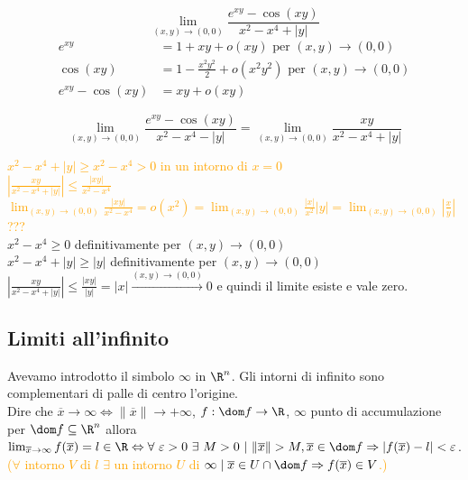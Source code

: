 \begin{exbar}
\begin{example}
	\begin{equation*}
		\lim_{(x,y)\rightarrow(0,0)}\frac{e^{xy}-\cos(xy)}{x^2-x^4+|y|}
	\end{equation*}
	\begin{align*} 
		e^{xy} &=1+xy+o(xy) \text{ per } (x,y)\rightarrow(0,0)
		\\
		\cos(xy) &=1-\frac{x^2y^2}{2}+o(x^2y^2) \text{ per } (x,y)\rightarrow(0,0)
		\\
		e^{xy}-\cos(xy) &=xy+o(xy)
	\end{align*}
	
	$$\lim_{(x,y)\rightarrow(0,0)}\frac{e^{xy}-\cos(xy)}{x^2-x^4-|y|}=\lim_{(x,y)\rightarrow(0,0)}\frac{xy}{x^2-x^4+|y|}$$
	
	\textcolor{orange}{$x^2-x^4+|y|\geq x^2-x^4>0$ in un intorno di $x=0$\\
		$|\frac{xy}{x^2-x^4+|y|}|\leq \frac{|xy|}{x^2-x^4}$\\
		$\lim_{(x,y)\rightarrow(0,0)}\frac{|xy|}{x^2-x^4}=o(x^2)=\lim_{(x,y)\rightarrow(0,0)} \frac{|x|}{x^2}|y|=\lim_{(x,y)\rightarrow(0,0)} |\frac{x}{y}|$???}\\
	$x^2-x^4 \geq 0$ definitivamente per $(x,y)\rightarrow(0,0)$\\
	$x^2-x^4+|y|\geq |y|$ definitivamente per $(x,y)\rightarrow(0,0)$\\
	$|\frac{xy}{x^2-x^4+|y|}|\leq \frac{|xy|}{|y|}=|x|\xrightarrow{(x,y)\rightarrow(0,0)} 0$ e quindi il limite esiste e vale zero.
\end{example}
\end{exbar}


\subsection{Limiti all'infinito}
Avevamo introdotto il simbolo  $\infty$ in $\R^n$. Gli intorni di infinito sono complementari di palle di centro l'origine.\\
Dire che $\overline{x} \rightarrow \infty \Leftrightarrow \|\overline{x}\|\rightarrow +\infty$, $f:\dom f\rightarrow\R$, $\infty$ punto di accumulazione per $\dom f \subseteq \R^n$ allora $\lim_{\overline{x}\rightarrow \infty} f(\overline{x})=l\in \R \Leftrightarrow \forall \,\, \epsilon >0 \,\, \exists\,\, M >0 \,\, |\,\, \|\overline{x}\|>M, \overline{x}\in \dom f \Rightarrow |f(\overline{x})-l|<\epsilon$.\\
\textcolor{orange}{($\forall$ intorno $V$ di $l$ $\exists$ un intorno $U$ di $\infty \mid \overline{x}\in U \cap \dom f\Rightarrow f(\overline{x})\in V$.)}


